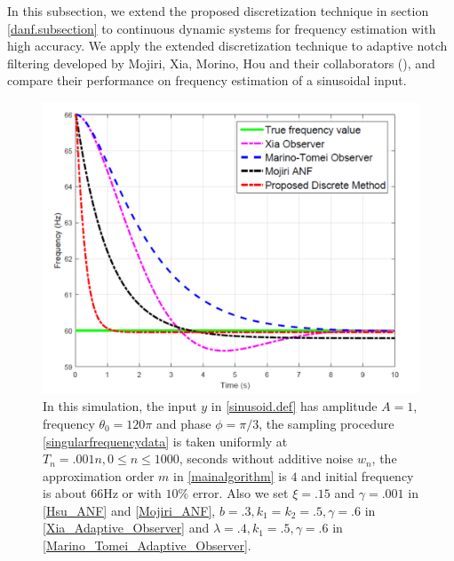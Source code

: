 \documentclass{UCF_ETD}
\begin{document}
In this subsection, we  extend the proposed discretization technique in section \ref{danf.subsection} to
continuous dynamic systems  for frequency estimation with high accuracy.   We apply the extended discretization technique to
adaptive notch filtering  developed by Mojiri, Xia, Morino, Hou and their collaborators (\cite{marino02, xia02, mojiri04, hou05, mojiri07, mojiri07b}), and compare their performance on frequency estimation of a sinusoidal input.

\begin{figure}[H]
\begin{center}
\includegraphics[scale=0.8]{NonuniformANF/AdaptiveObserver_ANF_Comparison}
\caption{%
 In this simulation, the  input $y$
in \eqref{sinusoid.def} has amplitude $A=1$,  frequency $\theta_0=120 \pi$ and
phase $\phi=\pi/3$,
the sampling  procedure
\eqref{singularfrequencydata} is taken uniformly at   $T_n=.001 n, 0\le n\le 1000$, seconds
without additive noise $w_n$,
the approximation order $m$ in \eqref{mainalgorithm} is $4$
and  initial frequency  is about $66$Hz or with $10\% $ error.
Also we set
 $\xi=.15$ and $\gamma=.001$  in \eqref{Hsu_ANF} and
 \eqref{Mojiri_ANF},
  $b = .3, k_1=k_2= .5, \gamma = .6$ in \eqref{Xia_Adaptive_Observer}
   and  $\lambda = .4, k_1 = .5, \gamma = .6$ in \eqref{Marino_Tomei_Adaptive_Observer}. }
\label{AdaptiveObserver_ANF_Comparison.fig}
\end{center}
\end{figure}
\end{document}
